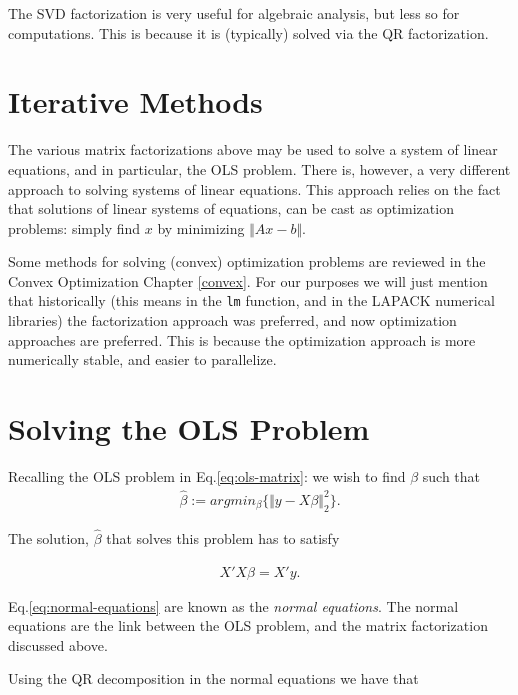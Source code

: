 \documentclass[]{book}
\theoremstyle{definition}
\theoremstyle{definition}
\theoremstyle{definition}
\theoremstyle{remark}
\begin{document}
The SVD factorization is very useful for algebraic analysis, but less so
for computations. This is because it is (typically) solved via the QR
factorization.

\section{Iterative Methods}\label{iterative-methods}

The various matrix factorizations above may be used to solve a system of
linear equations, and in particular, the OLS problem. There is, however,
a very different approach to solving systems of linear equations. This
approach relies on the fact that solutions of linear systems of
equations, can be cast as optimization problems: simply find \(x\) by
minimizing \(\Vert Ax-b \Vert\).

Some methods for solving (convex) optimization problems are reviewed in
the Convex Optimization Chapter \ref{convex}. For our purposes we will
just mention that historically (this means in the \texttt{lm} function,
and in the LAPACK numerical libraries) the factorization approach was
preferred, and now optimization approaches are preferred. This is
because the optimization approach is more numerically stable, and easier
to parallelize.

\section{Solving the OLS Problem}\label{solving-ols}

Recalling the OLS problem in Eq.\eqref{eq:ols-matrix}: we wish to find
\(\beta\) such that\\

\begin{align}
  \hat \beta:= argmin_\beta \{ \Vert y-X\beta \Vert^2_2 \}.
\end{align}

The solution, \(\hat \beta\) that solves this problem has to satisfy

\begin{align}
  X'X \beta = X'y.
  \label{eq:normal-equations}
\end{align}

Eq.\eqref{eq:normal-equations} are known as the \emph{normal equations}.
The normal equations are the link between the OLS problem, and the
matrix factorization discussed above.

Using the QR decomposition in the normal equations we have that
\end{document}
